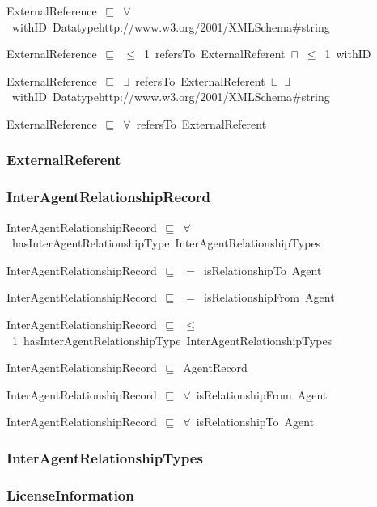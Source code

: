 \documentclass{article}
\begin{document}
ExternalReference~\ensuremath{\sqsubseteq}~\ensuremath{\forall}~withID~Datatypehttp://www.w3.org/2001/XMLSchema#string~

ExternalReference~\ensuremath{\sqsubseteq}~\ensuremath{\leq}~1~refersTo~ExternalReferent~\ensuremath{\sqcap}~\ensuremath{\leq}~1~withID~

ExternalReference~\ensuremath{\sqsubseteq}~\ensuremath{\exists}~refersTo~ExternalReferent~\ensuremath{\sqcup}~\ensuremath{\exists}~withID~Datatypehttp://www.w3.org/2001/XMLSchema#string~

ExternalReference~\ensuremath{\sqsubseteq}~\ensuremath{\forall}~refersTo~ExternalReferent~

\subsubsection*{ExternalReferent}

\subsubsection*{InterAgentRelationshipRecord}

InterAgentRelationshipRecord~\ensuremath{\sqsubseteq}~\ensuremath{\forall}~hasInterAgentRelationshipType~InterAgentRelationshipTypes~

InterAgentRelationshipRecord~\ensuremath{\sqsubseteq}~\ensuremath{=}~isRelationshipTo~Agent~

InterAgentRelationshipRecord~\ensuremath{\sqsubseteq}~\ensuremath{=}~isRelationshipFrom~Agent~

InterAgentRelationshipRecord~\ensuremath{\sqsubseteq}~\ensuremath{\leq}~1~hasInterAgentRelationshipType~InterAgentRelationshipTypes~

InterAgentRelationshipRecord~\ensuremath{\sqsubseteq}~AgentRecord~

InterAgentRelationshipRecord~\ensuremath{\sqsubseteq}~\ensuremath{\forall}~isRelationshipFrom~Agent~

InterAgentRelationshipRecord~\ensuremath{\sqsubseteq}~\ensuremath{\forall}~isRelationshipTo~Agent~

\subsubsection*{InterAgentRelationshipTypes}

\subsubsection*{LicenseInformation}
\end{document}
